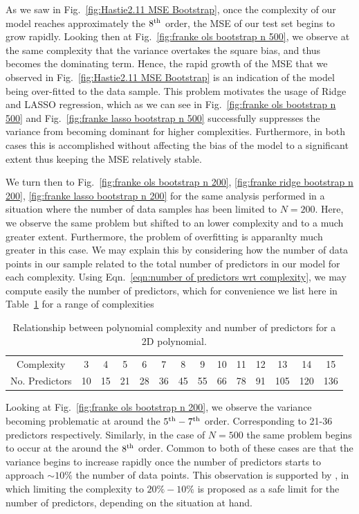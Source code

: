 \documentclass[reprint, english, nofootinbib]{revtex4-2}
\begin{document}
As we saw in Fig.~\ref{fig:Hastie2.11 MSE Bootstrap}, once the complexity of our model reaches approximately the $8^{\textup{th}}$ order, the MSE of our test set begins to grow rapidly. Looking then at Fig.~\ref{fig:franke ols bootstrap n 500}, we observe at the same complexity that the variance overtakes the square bias, and thus becomes the dominating term. Hence, the rapid growth of the MSE that we observed in Fig.~\ref{fig:Hastie2.11 MSE Bootstrap} is an indication of the model being over-fitted to the data sample.
This problem motivates the usage of Ridge and LASSO regression, which as we can see in Fig.~\ref{fig:franke ols bootstrap n 500} and Fig.~\ref{fig:franke lasso bootstrap n 500} successfully suppresses the variance from becoming dominant for higher complexities. Furthermore, in both cases this is accomplished without affecting the bias of the model to a significant extent thus keeping the MSE relatively stable.

We turn then to Fig.~\ref{fig:franke ols bootstrap n 200}, \ref{fig:franke ridge bootstrap n 200}, \ref{fig:franke lasso bootstrap n 200} for the same analysis performed in a situation where the number of data samples has been limited to $N=200$. Here, we observe the same problem but shifted to an lower complexity and to a much greater extent. Furthermore, the problem of overfitting is apparanlty much greater in this case. We may explain this by considering how the number of data points in our sample related to the total number of predictors in our model for each complexity. Using Eqn.~\ref{eqn:number of predictors wrt complexity}, we may compute easily the number of predictors, which for convenience we list here in Table~\ref{tab: no predictors wrt complexity} for a range of complexities

\begin{table}[h!]
    \caption{\label{tab: no predictors wrt complexity}Relationship between polynomial complexity and number of predictors for a 2D polynomial.}
    \begin{tabular}{|c | c | c | c | c | c | c | c | c | c | c | c | c | c |}
    \hline
     Complexity     & 3  & 4  & 5  & 6  & 7  & 8  & 9  & 10 & 11 & 12 & 13 & 14 & 15 \\
     No. Predictors & 10 & 15 & 21 & 28 & 36 & 45 & 55 & 66 & 78 & 91 & 105 & 120 & 136
     \\ \hline
    \end{tabular}
\end{table}

Looking at Fig.~\ref{fig:franke ols bootstrap n 200}, we observe the variance becoming problematic at around the $5^{\textup{th}}-7^{\textup{th}}$ order. Corresponding to 21-36 predictors respectively. Similarly, in the case of $N=500$ the same problem begins to occur at the around the $8^{\textup{th}}$ order. Common to both of these cases are that the variance begins to increase rapidly once the number of predictors starts to approach $\sim 10\%$ the number of data points. This observation is supported by \textcite{Harell}, in which limiting the complexity to $20\%-10\%$ is proposed as a safe limit for the number of predictors, depending on the situation at hand.
\end{document}
